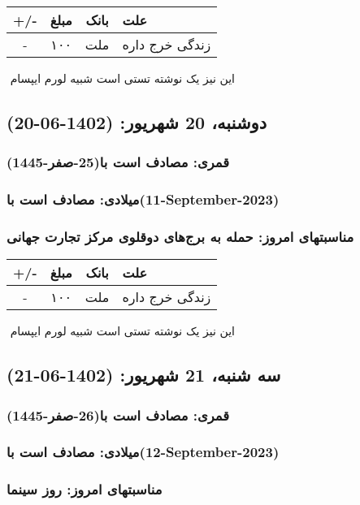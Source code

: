 \documentclass{article}
\newcommand{\rnote}[1]{\marginpar{\textcolor{color}{\StrSubstitute{\##1}{ }{\_}}}}
\newcommand{\myRow}[4]{
    #1 & #2 & #3 & #4 \\ \hline
}
\begin{document}
\begin{tabular}{ | c | c | c | p{5cm} |}
    \hline
    \myRow{ +/- }{مبلغ}{بانک}{علت}
    \myRow{-}{۱۰۰}{ملت}{زندگی خرج داره}
\end{tabular}
\newline
\newline

‌
\rnote{تست}
این نیز یک نوشته تستی است شبیه لورم ایپسام




\newpage
{}
\textcolor{color}{
\section{ دوشنبه، 20 شهریور: (1402-06-20) }
\subsubsection*{قمری: مصادف است با(25-صفر-1445)} 
\subsubsection*{میلادی: مصادف است با(11-September-2023)}
\subsubsection*{مناسبتهای امروز: حمله به برج‌های دوقلوی مرکز تجارت جهانی}
}


\begin{tabular}{ | c | c | c | p{5cm} |}
    \hline
    \myRow{ +/- }{مبلغ}{بانک}{علت}
    \myRow{-}{۱۰۰}{ملت}{زندگی خرج داره}
\end{tabular}
\newline
\newline

‌
\rnote{تست}
این نیز یک نوشته تستی است شبیه لورم ایپسام




\newpage
{}
\textcolor{color}{
\section{ سه شنبه، 21 شهریور: (1402-06-21) }
\subsubsection*{قمری: مصادف است با(26-صفر-1445)} 
\subsubsection*{میلادی: مصادف است با(12-September-2023)}
\subsubsection*{مناسبتهای امروز: روز سینما}
}
\end{document}
